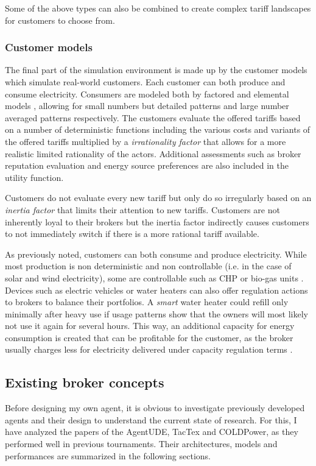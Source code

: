 Some of the above types can also be combined to create complex tariff landscapes for customers to choose from.

\subsubsection{Customer models}%

The final part of the simulation environment is made up by the customer models which simulate real-world customers.
Each customer can both produce and consume electricity. Consumers are modeled both by factored and elemental models
\citep[p.14]{ketter2018powertac}, allowing for small numbers but detailed patterns and large number averaged
patterns respectively. The customers evaluate the offered tariffs based on a number of deterministic functions
including the various costs and variants of the offered tariffs multiplied by a \emph{irrationality factor} that
allows for a more realistic limited rationality of the actors. Additional assessments such as broker reputation
evaluation and energy source preferences are also included in the utility function.

Customers do not evaluate every new tariff but only do so irregularly based on an \emph{inertia factor} that limits
their attention to new tariffs. Customers are not inherently loyal to their brokers but the inertia factor
indirectly causes customers to not immediately switch if there is a more rational tariff available.

As previously noted, customers can both consume and produce electricity. While most production is non deterministic
and non controllable (i.e. in the case of solar and wind electricity), some are controllable such as \ac{CHP} or
bio-gas units \citep[p.16]{ketter2018powertac}. Devices such as electric vehicles or water heaters can also offer
regulation actions to brokers to balance their portfolios. A \emph{smart} water heater could refill only minimally
after heavy use if usage patterns show that the owners will most likely not use it again for several hours. This
way, an additional capacity for energy consumption is created that can be profitable for the customer, as the broker
usually charges less for electricity delivered under capacity regulation terms \citep[p.14ff.]{ketter2018powertac}.

\subsection{Existing broker concepts}%
\label{sub:existing_broker_concepts}
Before designing my own agent, it is obvious to investigate previously developed agents and their design to understand
the current state of research. For this, I have analyzed the papers of the AgentUDE, TacTex and COLDPower, as they
performed well in previous tournaments. Their architectures, models and performances are summarized in the following
sections.

